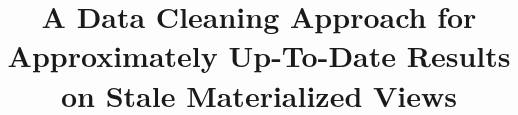 \documentclass{sig-alternate}
\begin{document}
\newtheorem{theorem}{Theorem}
\newtheorem{example}{Example}
\newtheorem{definition}{Definition}
\newtheorem{proposition}{Proposition}
\newtheorem{lemma}{Lemma}
\newtheorem{corollary}{Corollary}

\newcommand{\dataset}{data set\xspace}
\newcommand{\datasets}{data sets\xspace}
\newcommand{\spview}{\textsf{SPView}\xspace}
\newcommand{\fjview}{\textsf{FJView}\xspace}
\newcommand{\aggview}{\textsf{AggView}\xspace}
\newcommand{\hashfunc}[1]{\textsf{hashfunc}(#1)\xspace}

\newcommand{\avgfunc}{\ensuremath{\texttt{avg} }\xspace}
\newcommand{\countfunc}{\ensuremath{\texttt{count}}\xspace}
\newcommand{\sumfunc}{\ensuremath{\texttt{sum} }\xspace}
\newcommand{\ratio}{\ensuremath{\rho }\xspace}


\newcommand{\tbl}[1]{\textsf{#1}\xspace}
\newcommand{\field}[1]{\textsf{#1}\xspace}
\newcommand{\cost}{\textrm{cost}\xspace}
\newcommand{\ans}{\textsf{ans}\xspace}
\newcommand{\dans}{\Delta\textsf{ans}\xspace}
\newcommand{\cqp}{correcting query processing\xspace}
\newcommand{\Cqp}{Correcting query processing\xspace}

\newcommand{\reminder}[1]{{{\textcolor{magenta}{\{\{\bf #1\}\}}}\xspace}}
\newcommand{\specialcell}[2][c]{%
  \begin{tabular}[#1]{@{}c@{}}#2\end{tabular}}

\pagestyle{plain}

\title{A Data Cleaning Approach for Approximately Up-To-Date Results on Stale Materialized Views}

\maketitle
\end{document}
